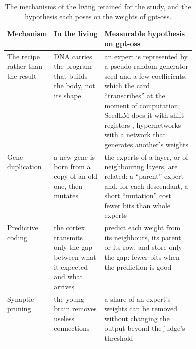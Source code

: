 \begin{table}[ht]
\centering\footnotesize
\caption[The mechanisms of the living and their measurable hypotheses]{The mechanisms of the living retained for the study, and the hypothesis each poses on the weights of gpt-oss.}
\label{t2d-tab:genome}
\begin{tabularx}{\linewidth}{@{}>{\raggedright\arraybackslash}p{0.17\linewidth}>{\raggedright\arraybackslash}p{0.27\linewidth}>{\raggedright\arraybackslash}X@{}}
\toprule
Mechanism & In the living & Measurable hypothesis on gpt-oss \\
\midrule
The recipe rather than the result & DNA carries the program that builds the body, not its shape & an expert is represented by a pseudo-random generator seed and a few coefficients, which the card ``transcribes'' at the moment of computation; SeedLM does it with shift registers \cite{shafipour2024seedlm}, hypernetworks with a network that generates another's weights \cite{ha2016hypernetworks} \\
Gene duplication & a new gene is born from a copy of an old one, then mutates \cite{ohno1970} & the experts of a layer, or of neighbouring layers, are related: a ``parent'' expert and, for each descendant, a short ``mutation'' cost fewer bits than whole experts \\
Predictive coding & the cortex transmits only the gap between what it expected and what arrives \cite{rao1999} & predict each weight from its neighbours, its parent or its row, and store only the gap: fewer bits when the prediction is good \\
Synaptic pruning & the young brain removes useless connections \cite{huttenlocher1979} & a share of an expert's weights can be removed without changing the output beyond the judge's threshold \cite{lecun1989obd,han2015deepcompression} \\
\bottomrule
\end{tabularx}
\end{table}

